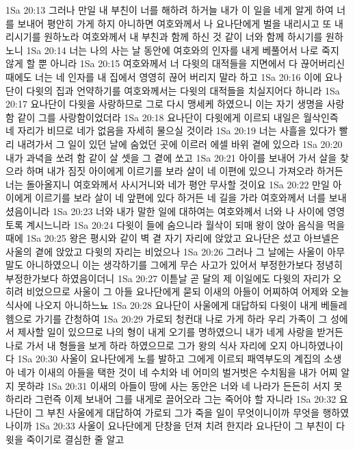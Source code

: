 1Sa 20:13  그러나 만일 내 부친이 너를 해하려 하거늘 내가 이 일을 네게 알게 하여 너를 보내어 평안히 가게 하지 아니하면 여호와께서 나 요나단에게 벌을 내리시고 또 내리시기를 원하노라 여호와께서 내 부친과 함께 하신 것 같이 너와 함께 하시기를 원하노니
1Sa 20:14  너는 나의 사는 날 동안에 여호와의 인자를 내게 베풀어서 나로 죽지 않게 할 뿐 아니라
1Sa 20:15  여호와께서 너 다윗의 대적들을 지면에서 다 끊어버리신 때에도 너는 네 인자를 내 집에서 영영히 끊어 버리지 말라 하고
1Sa 20:16  이에 요나단이 다윗의 집과 언약하기를 여호와께서는 다윗의 대적들을 치실지어다 하니라
1Sa 20:17  요나단이 다윗을 사랑하므로 그로 다시 맹세케 하였으니 이는 자기 생명을 사랑함 같이 그를 사랑함이었더라
1Sa 20:18  요나단이 다윗에게 이르되 내일은 월삭인즉 네 자리가 비므로 네가 없음을 자세히 물으실 것이라
1Sa 20:19  너는 사흘을 있다가 빨리 내려가서 그 일이 있던 날에 숨었던 곳에 이르러 에셀 바위 곁에 있으라
1Sa 20:20  내가 과녁을 쏘려 함 같이 살 셋을 그 곁에 쏘고
1Sa 20:21  아이를 보내어 가서 살을 찾으라 하며 내가 짐짓 아이에게 이르기를 보라 살이 네 이편에 있으니 가져오라 하거든 너는 돌아올지니 여호와께서 사시거니와 네가 평안 무사할 것이요
1Sa 20:22  만일 아이에게 이르기를 보라 살이 네 앞편에 있다 하거든 네 길을 가라 여호와께서 너를 보내셨음이니라
1Sa 20:23  너와 내가 말한 일에 대하여는 여호와께서 너와 나 사이에 영영토록 계시느니라
1Sa 20:24  다윗이 들에 숨으니라 월삭이 되매 왕이 앉아 음식을 먹을 때에
1Sa 20:25  왕은 평시와 같이 벽 곁 자기 자리에 앉았고 요나단은 섰고 아브넬은 사울의 곁에 앉았고 다윗의 자리는 비었으나
1Sa 20:26  그러나 그 날에는 사울이 아무 말도 아니하였으니 이는 생각하기를 그에게 무슨 사고가 있어서 부정한가보다 정녕히 부정한가보다 하였음이더니
1Sa 20:27  이튿날 곧 달의 제 이일에도 다윗의 자리가 오히려 비었으므로 사울이 그 아들 요나단에게 묻되 이새의 아들이 어찌하여 어제와 오늘 식사에 나오지 아니하느뇨
1Sa 20:28  요나단이 사울에게 대답하되 다윗이 내게 베들레헴으로 가기를 간청하여
1Sa 20:29  가로되 청컨대 나로 가게 하라 우리 가족이 그 성에서 제사할 일이 있으므로 나의 형이 내게 오기를 명하였으니 내가 네게 사랑을 받거든 나로 가서 내 형들을 보게 하라 하였으므로 그가 왕의 식사 자리에 오지 아니하였나이다
1Sa 20:30  사울이 요나단에게 노를 발하고 그에게 이르되 패역부도의 계집의 소생아 네가 이새의 아들을 택한 것이 네 수치와 네 어미의 벌거벗은 수치됨을 내가 어찌 알지 못하랴
1Sa 20:31  이새의 아들이 땅에 사는 동안은 너와 네 나라가 든든히 서지 못하리라 그런즉 이제 보내어 그를 내게로 끌어오라 그는 죽어야 할 자니라
1Sa 20:32  요나단이 그 부친 사울에게 대답하여 가로되 그가 죽을 일이 무엇이니이까 무엇을 행하였나이까
1Sa 20:33  사울이 요나단에게 단창을 던져 치려 한지라 요나단이 그 부친이 다윗을 죽이기로 결심한 줄 알고

